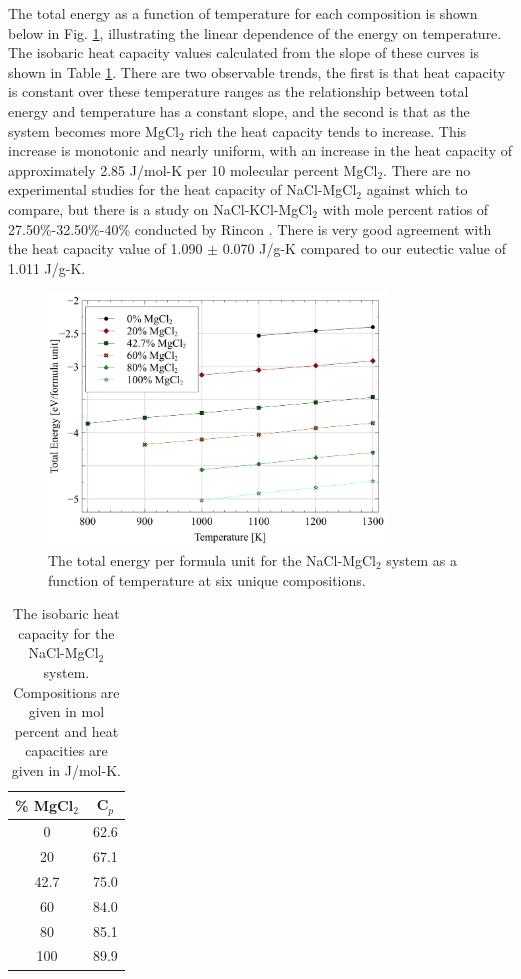 \documentclass[review]{elsarticle}
\begin{document}
\FloatBarrier



The total energy as a function of temperature for each composition is shown below in Fig. \ref{fig:energy}, illustrating the linear dependence of the energy on temperature. The isobaric heat capacity values calculated from the slope of these curves is shown in Table \ref{table:cp}. There are two observable trends, the first is that heat capacity is constant over these temperature ranges as the relationship between total energy and temperature has a constant slope, and the second is that as the system becomes more MgCl$_2$ rich the heat capacity tends to increase. This increase is monotonic and nearly uniform, with an increase in the heat capacity of approximately 2.85 J/mol-K per 10 molecular percent MgCl$_2$. There are no experimental studies for the heat capacity of NaCl-MgCl$_2$ against which to compare, but there is a study on NaCl-KCl-MgCl$_2$ with mole percent ratios of 27.50\%-32.50\%-40\% conducted by Rincon \cite{del2020experimental}. There is very good agreement with the heat capacity value of 1.090 $\pm$ 0.070 J/g-K compared to our eutectic value of 1.011 J/g-K.

\begin{figure}[h]
 \centering
 \includegraphics[width=0.8\textwidth]{images/energy.jpg} 
 \caption{The total energy per formula unit for the NaCl-MgCl$_2$ system as a function of temperature at six unique compositions.}
 \label{fig:energy}
\end{figure}

\begin{table}[h!]
\centering
\caption{The isobaric heat capacity for the NaCl-MgCl$_2$ system. Compositions are given in mol percent and heat capacities are given in J/mol-K.}

\begin{tabular}{|c|c|}
\hline
\% MgCl$_2$ &  C$_p$\\
\hline
0  &  62.6\\
20 &  67.1  \\
42.7  &  75.0  \\
60 &  84.0  \\
80 &  85.1  \\
100 &  89.9  \\
\hline
\end{tabular}
\label{table:cp}
\end{table}
\end{document}
